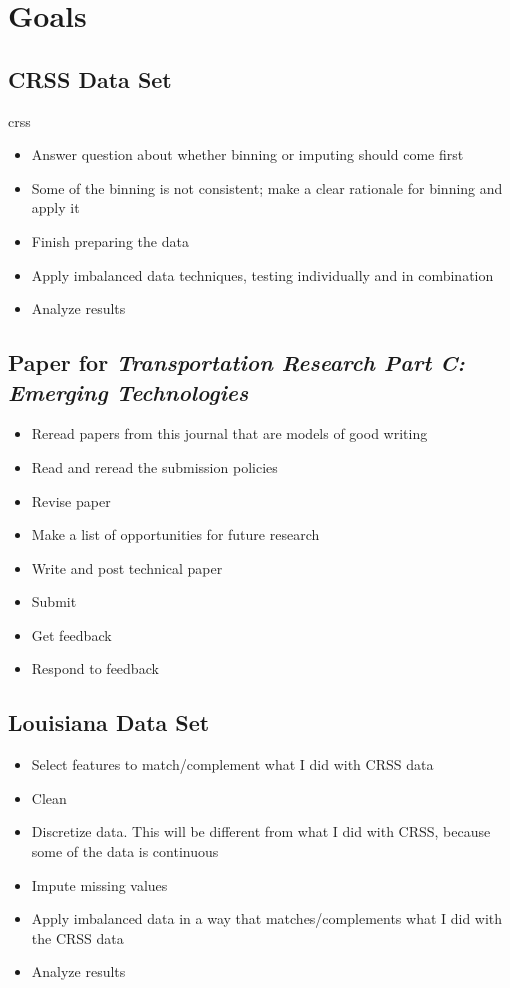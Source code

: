 \section{Goals}

\subsection{CRSS Data Set}

\acrfull{crss} \cite {CRSS}

\begin{itemize}
	\item Answer question about whether binning or imputing should come first
	\item Some of the binning is not consistent; make a clear rationale for binning and apply it
	\item Finish preparing the data
	\item Apply imbalanced data techniques, testing individually and in combination
	\item Analyze results
\end{itemize}

\subsection{Paper for {\it Transportation Research Part C:  Emerging Technologies}}

\begin{itemize}
	\item Reread papers from this journal that are models of good writing
	\item Read and reread the submission policies
	\item Revise paper
	\item Make a list of opportunities for future research
	\item Write and post technical paper
	\item Submit
	\item Get feedback
	\item Respond to feedback
\end{itemize}	

\subsection{Louisiana Data Set}

\begin{itemize}
	\item Select features to match/complement what I did with CRSS data
	\item Clean
	\item Discretize data.  This will be different from what I did with CRSS, because some of the data is continuous
	\item Impute missing values
	\item Apply imbalanced data in a way that matches/complements what I did with the CRSS data
	\item Analyze results
\end{itemize}

